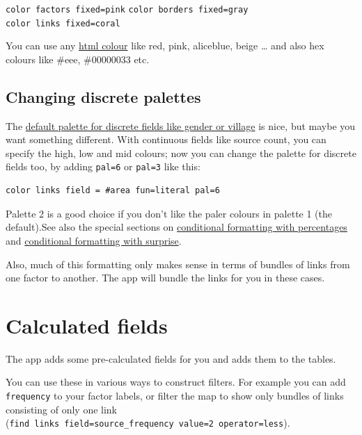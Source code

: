 \documentclass[
]{book}
\begin{document}
\texttt{color\ factors\ fixed=pink}
\texttt{color\ borders\ fixed=gray}
\texttt{color\ links\ fixed=coral}

You can use any \href{https://www.w3schools.com/colors/colors_names.asp}{html colour} like red, pink, aliceblue, beige \ldots{} and also hex colours like \#eee, \#00000033 etc.

\hypertarget{xdiscrete-palettes}{%
\subsection{Changing discrete palettes}\label{xdiscrete-palettes}}

The \href{https://colorbrewer2.org/\#type=qualitative\&scheme=Set1\&n=9}{default palette for discrete fields like gender or village} is nice, but maybe you want something different. With continuous fields like source count, you can specify the high, low and mid colours; now you can change the palette for discrete fields too, by adding \texttt{pal=6} or \texttt{pal=3} like this:

\begin{verbatim}
color links field = #area fun=literal pal=6
\end{verbatim}

Palette 2 is a good choice if you don't like the paler colours in palette 1 (the default).See also the special sections on \protect\hyperlink{percent}{conditional formatting with percentages} and \protect\hyperlink{xsurprise}{conditional formatting with surprise}.

Also, much of this formatting only makes sense in terms of bundles of links from one factor to another. The app will bundle the links for you in these cases.

\hypertarget{xcalculated-fields}{%
\section{Calculated fields}\label{xcalculated-fields}}

The app adds some pre-calculated fields for you and adds them to the tables.

You can use these in various ways to construct filters. For example you can add \texttt{frequency} to your factor labels, or filter the map to show only bundles of links consisting of only one link (\texttt{find\ links\ field=source\_frequency\ value=2\ operator=less}).
\end{document}
